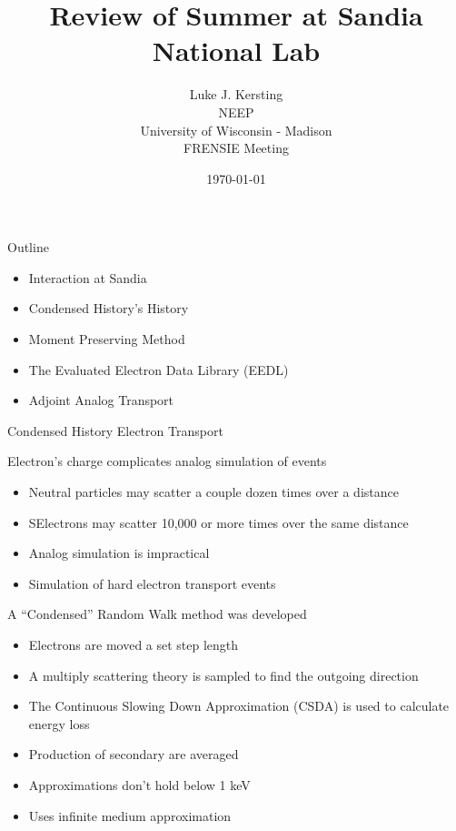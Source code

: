 \documentclass{beamer}
\author{Luke J. Kersting
    \\ NEEP
    \\ University of Wisconsin - Madison
    \\ FRENSIE Meeting
}
\date{\today}
\title{Review of Summer at Sandia National Lab}
\begin{document}
\maketitle

\begin{frame}{Outline}

  \begin{itemize}
    \item Interaction at Sandia
    \item Condensed History's History
    \item Moment Preserving Method
    \item The Evaluated Electron Data Library (EEDL)
    \item Adjoint Analog Transport
  \end{itemize}

\end{frame}

  \begin{frame}{Condensed History Electron Transport}

  \begin{block}{Electron’s charge complicates analog simulation of events}
    \begin{itemize}
      \item Neutral particles may scatter a couple dozen times over a distance
      \item SElectrons may scatter 10,000 or more times over the same distance
      \item Analog simulation is impractical
      \item Simulation of hard electron transport events
    \end{itemize}
  \end{block}
    
  \begin{block}{A “Condensed” Random Walk method was developed}
    \begin{itemize}
      \item Electrons are moved a set step length
      \item A multiply scattering theory is sampled to find the outgoing direction
      \item The Continuous Slowing Down Approximation (CSDA) is used to calculate energy loss
      \item Production of secondary are averaged
      \item Approximations don’t hold below 1 keV
      \item Uses infinite medium approximation
    \end{itemize}    
  \end{block}  

\end{frame}
\end{document}
